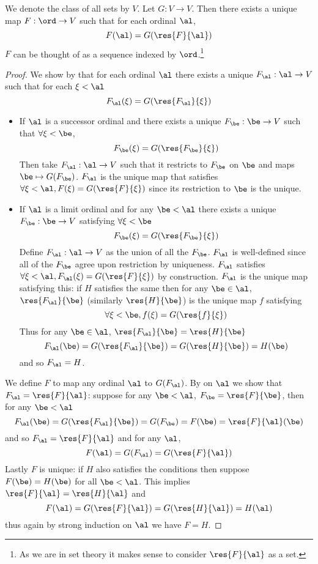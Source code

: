 \begin{prop}
    We denote the class of all sets by $V$.
    Let $G : V \to V$.
    Then there exists a unique map $F : \ord \to V$ such that 
    for each ordinal $\al$, 
    \[F(\al) = G(\res{F}{\al})\]
    $F$ can be thought of as a sequence indexed by $\ord$.\footnote{As 
        we are in set theory it makes 
        sense to consider $\res{F}{\al}$ as a set.}
\end{prop}
\begin{proof}
    We show by 
    that for each ordinal $\al$ there exists a unique $F_\al : \al \to V$
    such that for each $\xi < \al$ 
    \[F_\al(\xi) = G(\res{F_\al}{\xi})\]
    \begin{itemize}
        \item If $\al$ is a successor ordinal and there exists a unique 
            $F_\be : \be \to V$ such that $\forall \xi < \be$,
            \[F_\be(\xi) = G(\res{F_\be}{\xi})\]
            Then take $F_\al : \al \to V$ such that it restricts to $F_\be$
            on $\be$ and maps $\be \mapsto G(F_\be)$.
            $F_\al$ is the unique map that satisfies 
            $\forall \xi < \al,F(\xi) = G(\res{F}{\xi})$ since its restriction
            to $\be$ is the unique. 
        \item If $\al$ is a limit ordinal and for any $\be < \al$ there exists a
            unique $F_\be : \be \to V$ satisfying $\forall \xi < \be$
            \[F_\be(\xi) = G(\res{F_\be}{\xi})\]
            Define $F_\al : \al \to V$ as the union of all the $F_\be$.
            $F_\al$ is well-defined since all of the $F_\be$ agree upon restriction
            by uniqueness.
            $F_\al$ satisfies $\forall \xi < \al, F_\al(\xi) = G(\res{F}{\xi})$ by 
            construction.
            $F_\al$ is the unique map satisfying this: if $H$ satisfies the same
            then for any $\be \in \al$, 
            $\res{F_\al}{\be}$ (similarly $\res{H}{\be}$) 
            is the unique map $f$ satisfying 
            \[\forall \xi < \be, f(\xi) = G(\res{f}{\xi})\]
            Thus for any $\be \in \al$, $\res{F_\al}{\be} = \res{H}{\be}$
            \[F_\al(\be) = G(\res{F_\al}{\be}) = G(\res{H}{\be}) = H(\be)\]
            and so $F_\al = H$.
    \end{itemize}
    We define $F$ to map any ordinal $\al$ to $G(F_\al)$.
    By  on 
    $\al$ we show that $F_\al = \res{F}{\al}$:
    suppose for any $\be < \al$, $F_\be = \res{F}{\be}$,
    then for any $\be < \al$
    \[F_\al(\be) = G(\res{F_\al}{\be}) = G(F_\be) = F(\be) = \res{F}{\al}(\be)\]
    and so $F_\al = \res{F}{\al}$ and for any $\al$,
    \[F(\al) = G(F_\al) = G(\res{F}{\al})\]
    Lastly $F$ is unique: if $H$ also satisfies the conditions then suppose
    $F(\be) = H(\be)$ for all $\be < \al$.
    This implies $\res{F}{\al} = \res{H}{\al}$ and
    \[F(\al) = G(\res{F}{\al}) = G(\res{H}{\al}) = H(\al)\]
    thus again by strong induction on $\al$ we have $F = H$.
\end{proof}